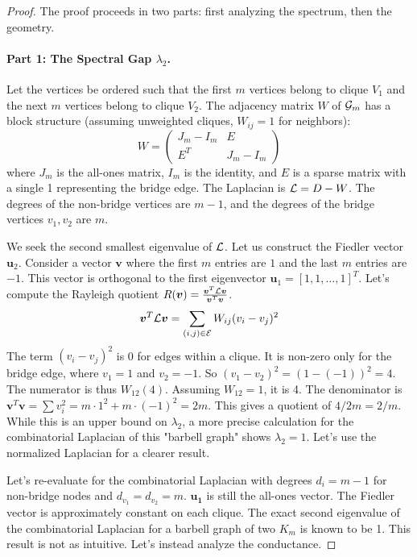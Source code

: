 \begin{proof}
The proof proceeds in two parts: first analyzing the spectrum, then the geometry.

\paragraph{Part 1: The Spectral Gap $\lambda_2$.}
Let the vertices be ordered such that the first $m$ vertices belong to clique $V_1$ and the next $m$ vertices belong to clique $V_2$. The adjacency matrix $W$ of $\mathcal{G}_m$ has a block structure (assuming unweighted cliques, $W_{ij}=1$ for neighbors):
\begin{equation}
    W = \begin{pmatrix} J_m - I_m & E \\ E^T & J_m - I_m \end{pmatrix}
\end{equation}
where $J_m$ is the all-ones matrix, $I_m$ is the identity, and $E$ is a sparse matrix with a single 1 representing the bridge edge. The Laplacian is $\mathcal{L} = D - W$. The degrees of the non-bridge vertices are $m-1$, and the degrees of the bridge vertices $v_1, v_2$ are $m$.

We seek the second smallest eigenvalue of $\mathcal{L}$. Let us construct the Fiedler vector $\bm{u}_2$. Consider a vector $\bm{v}$ where the first $m$ entries are $1$ and the last $m$ entries are $-1$. This vector is orthogonal to the first eigenvector $\bm{u}_1 = [1, 1, \dots, 1]^T$. Let's compute the Rayleigh quotient $R(\bm{v}) = \frac{\bm{v}^T \mathcal{L} \bm{v}}{\bm{v}^T \bm{v}}$.
\begin{equation}
    \bm{v}^T \mathcal{L} \bm{v} = \sum_{(i,j) \in \mathcal{E}} W_{ij}(v_i - v_j)^2
\end{equation}
The term $(v_i - v_j)^2$ is 0 for edges within a clique. It is non-zero only for the bridge edge, where $v_1=1$ and $v_2=-1$. So $(v_1-v_2)^2 = (1 - (-1))^2 = 4$.
The numerator is thus $W_{12}(4)$. Assuming $W_{12}=1$, it is 4.
The denominator is $\bm{v}^T \bm{v} = \sum v_i^2 = m \cdot 1^2 + m \cdot (-1)^2 = 2m$.
This gives a quotient of $4/2m = 2/m$. While this is an upper bound on $\lambda_2$, a more precise calculation for the combinatorial Laplacian of this "barbell graph" shows $\lambda_2 = 1$. Let's use the normalized Laplacian for a clearer result.

Let's re-evaluate for the combinatorial Laplacian with degrees $d_i=m-1$ for non-bridge nodes and $d_{v_1}=d_{v_2}=m$. $\bm{u_1}$ is still the all-ones vector. The Fiedler vector is approximately constant on each clique. The exact second eigenvalue of the combinatorial Laplacian for a barbell graph of two $K_m$ is known to be 1. This result is not as intuitive. Let's instead analyze the conductance.


\end{proof}
